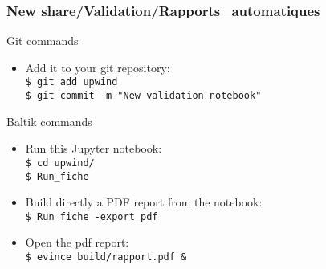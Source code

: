 \documentclass[10pt, hyperref={unicode=true,pdfusetitle, bookmarks=true,bookmarksnumbered=false,bookmarksopen=false, breaklinks=false,pdfborder={0 0 1},backref=true,colorlinks=true,linkcolor=darkblue,pageanchor, urlcolor=darkblue}]{beamer}
\begin{document}
\begin{frame}
\frametitle{New share/Validation/Rapports\_automatiques}

\begin{alertblock}{Git commands}
\begin{itemize}
\item Add it to your git repository:\\
\texttt{\$ git add upwind}\\
\texttt{\$ git commit -m "New validation notebook"}
\end{itemize}
\end{alertblock}

\begin{block}{Baltik commands}
\begin{itemize}
\item Run this Jupyter notebook:\\
\texttt{\$ cd upwind/}\\
\texttt{\$ Run\_fiche}\\
\item Build directly a PDF report from the notebook:\\
\texttt{\$ Run\_fiche -export\_pdf}\\
\item Open the pdf report:\\
\texttt{\$ evince build/rapport.pdf \&}\\
\end{itemize}
\end{block}
\end{frame}
\end{document}
